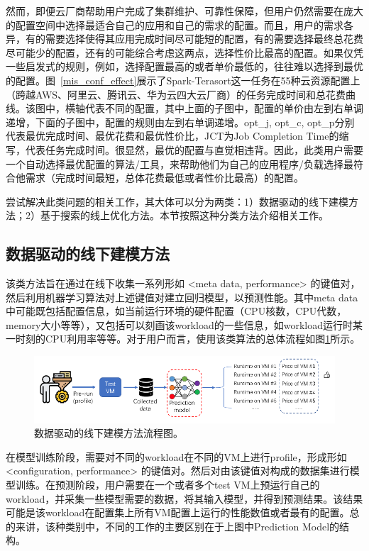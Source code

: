 然而，即便云厂商帮助用户完成了集群维护、可靠性保障，但用户仍然需要在庞大的配置空间中选择最适合自己的应用和自己的需求的配置。而且，用户的需求各异，有的需要选择使得其应用完成时间尽可能短的配置，有的需要选择最终总花费尽可能少的配置，还有的可能综合考虑这两点，选择性价比最高的配置。如果仅凭一些启发式的规则，例如，选择配置最高的或者单价最低的，往往难以选择到最优的配置。图~\ref{mis_conf_effect}展示了Spark-Terasort这一任务在55种云资源配置上（跨越AWS、阿里云、腾讯云、华为云四大云厂商）的任务完成时间和总花费曲线。该图中，横轴代表不同的配置，其中上面的子图中，配置的单价由左到右单调递增，下面的子图中，配置的规则由左到右单调递增。opt\_j, opt\_c, opt\_p分别代表最优完成时间、最优花费和最优性价比，JCT为Job Completion Time的缩写，代表任务完成时间。很显然，最优的配置与直觉相违背。因此，此类用户需要一个自动选择最优配置的算法/工具，来帮助他们为自己的应用程序/负载选择最符合他需求（完成时间最短，总体花费最低或者性价比最高）的配置。

尝试解决此类问题的相关工作，其大体可以分为两类：1）数据驱动的线下建模方法；2）基于搜索的线上优化方法。本节按照这种分类方法介绍相关工作。

\subsection{数据驱动的线下建模方法}\label{sec_profling}

该类方法旨在通过在线下收集一系列形如 <meta data, performance> 的键值对，然后利用机器学习算法对上述键值对建立回归模型，以预测性能。其中meta data中可能既包括配置信息，如当前运行环境的硬件配置（CPU核数，CPU代数，memory大小等等），又包括可以刻画该workload的一些信息，如workload运行时某一时刻的CPU利用率等等。对于用户而言，使用该类算法的总体流程如图\ref{offline_profiling}所示。

\begin{figure}[h]
    \centerline{\includegraphics[width=\textwidth]{figures/offline_profiling.png}}
    \caption{数据驱动的线下建模方法流程图。}
    \label{offline_profiling}
\end{figure}

在模型训练阶段，需要对不同的workload在不同的VM上进行profile，形成形如<configuration, performance> 的键值对。然后对由该键值对构成的数据集进行模型训练。在预测阶段，用户需要在一个或者多个test VM上预运行自己的workload，并采集一些模型需要的数据，将其输入模型，并得到预测结果。该结果可能是该workload在配置集上所有VM配置上运行的性能数值或者最有的配置。总的来讲，该种类别中，不同的工作的主要区别在于上图中Prediction Model的结构。

